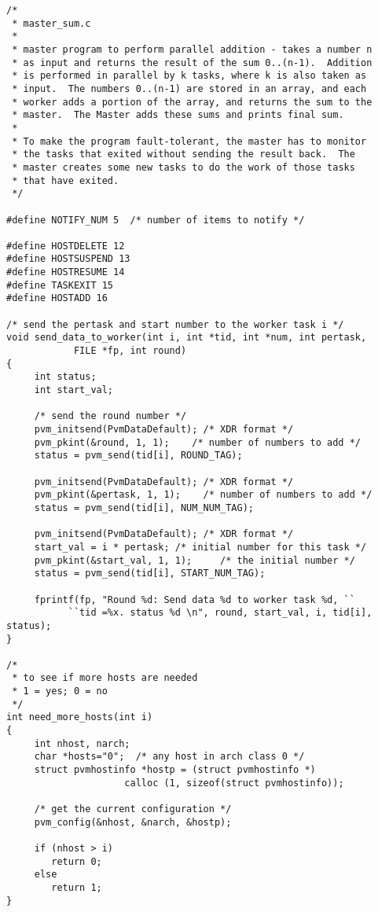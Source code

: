 \CondorVerySmall
\begin{verbatim}
/* 
 * master_sum.c
 *
 * master program to perform parallel addition - takes a number n 
 * as input and returns the result of the sum 0..(n-1).  Addition 
 * is performed in parallel by k tasks, where k is also taken as 
 * input.  The numbers 0..(n-1) are stored in an array, and each 
 * worker adds a portion of the array, and returns the sum to the 
 * master.  The Master adds these sums and prints final sum.  
 *
 * To make the program fault-tolerant, the master has to monitor 
 * the tasks that exited without sending the result back.  The 
 * master creates some new tasks to do the work of those tasks 
 * that have exited. 
 */

#define NOTIFY_NUM 5  /* number of items to notify */

#define HOSTDELETE 12
#define HOSTSUSPEND 13
#define HOSTRESUME 14
#define TASKEXIT 15
#define HOSTADD 16
    
/* send the pertask and start number to the worker task i */
void send_data_to_worker(int i, int *tid, int *num, int pertask, 
            FILE *fp, int round)
{
     int status;
     int start_val;
     
     /* send the round number */
     pvm_initsend(PvmDataDefault); /* XDR format */
     pvm_pkint(&round, 1, 1);    /* number of numbers to add */
     status = pvm_send(tid[i], ROUND_TAG);

     pvm_initsend(PvmDataDefault); /* XDR format */
     pvm_pkint(&pertask, 1, 1);    /* number of numbers to add */
     status = pvm_send(tid[i], NUM_NUM_TAG);

     pvm_initsend(PvmDataDefault); /* XDR format */
     start_val = i * pertask; /* initial number for this task */
     pvm_pkint(&start_val, 1, 1);     /* the initial number */
     status = pvm_send(tid[i], START_NUM_TAG);   

     fprintf(fp, "Round %d: Send data %d to worker task %d, ``
           ``tid =%x. status %d \n", round, start_val, i, tid[i], status);
}

/* 
 * to see if more hosts are needed 
 * 1 = yes; 0 = no 
 */
int need_more_hosts(int i)
{
     int nhost, narch;
     char *hosts="0";  /* any host in arch class 0 */
     struct pvmhostinfo *hostp = (struct pvmhostinfo *) 
                     calloc (1, sizeof(struct pvmhostinfo));

     /* get the current configuration */
     pvm_config(&nhost, &narch, &hostp);
     
     if (nhost > i)
        return 0;
     else 
        return 1;
}


\end{verbatim}
